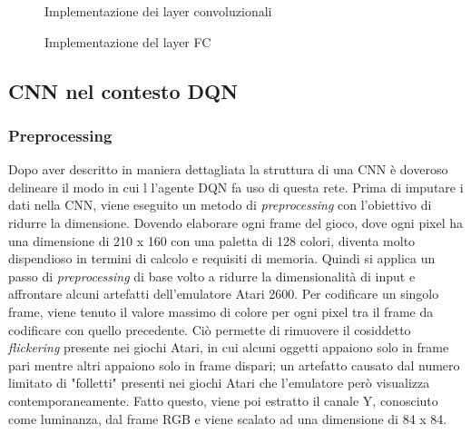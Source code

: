 \documentclass[twoside,twocolumn,10pt]{extarticle}
\theoremstyle{definition}
\begin{document}
\begin{figure}[ht!]
	\centering
	
	\caption{Implementazione dei layer convoluzionali}
	\label{fig:layerConv}
\end{figure}

\begin{figure}[ht!]
	\centering
	
	\caption{Implementazione del layer FC}
	\label{fig:layerFC}
\end{figure}

\subsection{CNN nel contesto DQN}
\subsubsection{Preprocessing}
Dopo aver descritto in maniera dettagliata la struttura di una CNN è doveroso delineare il modo in cui l l'agente DQN fa uso di questa rete. Prima di imputare i dati nella CNN, viene eseguito un metodo di \textit{preprocessing} con l'obiettivo di ridurre la dimensione. Dovendo elaborare ogni frame del gioco, dove ogni pixel ha una dimensione di 210 x 160 con una paletta di 128 colori, diventa molto dispendioso in termini di calcolo e requisiti di memoria. Quindi si applica un passo di \textit{preprocessing} di base volto a ridurre la dimensionalità di input e affrontare alcuni artefatti dell'emulatore Atari 2600.
Per codificare un singolo frame, viene tenuto il valore massimo di colore per ogni pixel tra il frame da codificare con quello precedente. Ciò permette di rimuovere il cosiddetto \textit{flickering} presente nei giochi Atari, in cui alcuni oggetti appaiono solo in frame pari mentre altri appaiono solo in frame dispari; un artefatto causato dal numero limitato di "folletti" presenti nei giochi Atari che l'emulatore però visualizza contemporaneamente. Fatto questo, viene poi estratto il canale Y, conosciuto come luminanza, dal frame RGB e viene scalato ad una dimensione di 84 x 84.
\end{document}

